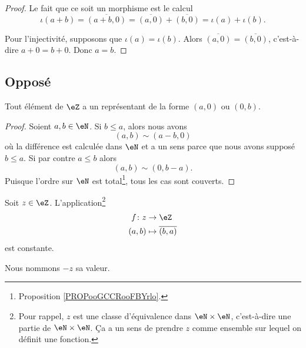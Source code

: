 \begin{proof}
    Le fait que ce soit un morphisme est le calcul
    \begin{equation}
        \iota(a+b)=\overline{ (a+b,0) }=\overline{ (a,0) }+\overline{ (b,0) }=\iota(a)+\iota(b).
    \end{equation}

    Pour l'injectivité, supposons que \( \iota(a)=\iota(b)\). Alors \( \overline{ (a,0) }=\overline{ (b,0) }\), c'est-à-dire \( a+0=b+0\). Donc \( a=b\).
\end{proof}


\subsection{Opposé}

\begin{lemma}       \label{LEMooSABNooZZDIes}
    Tout élément de \( \eZ\) a un représentant de la forme \( (a,0)\) ou \( (0,b)\).
\end{lemma}

\begin{proof}
    Soient \( a,b\in \eN\). Si \( b\leq a\), alors nous avons
    \begin{equation}
        (a,b)\sim(a-b,0)
    \end{equation}
    où la différence est calculée dans \( \eN\) et a un sens parce que nous avons supposé \( b\leq a\). Si par contre \( a\leq b\) alors
    \begin{equation}
        (a,b)\sim(0,b-a).
    \end{equation}
    Puisque l'ordre sur \( \eN\) est total\footnote{Proposition \ref{PROPooGCCRooFBYrlo}.}, tous les cas sont couverts.
\end{proof}

\begin{lemmaDef}
    Soit \( z\in \eZ\). L'application\footnote{Pour rappel, \( z\) est une classe d'équivalence dans \( \eN\times \eN\), c'est-à-dire une partie de \( \eN\times \eN\). Ça a un sens de prendre \( z\) comme ensemble sur lequel on définit une fonction.}
    \begin{equation}
        \begin{aligned}
            f\colon z&\to \eZ \\
            (a,b)&\mapsto \overline{ (b,a) } 
        \end{aligned}
    \end{equation}
    est constante.

    Nous nommons \( -z\) sa valeur.
\end{lemmaDef}

